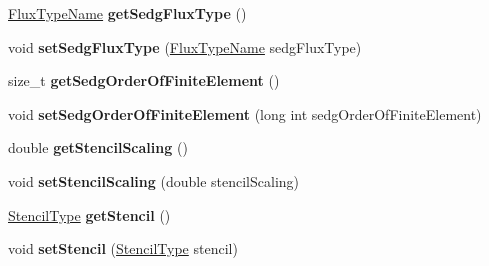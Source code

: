 \begin{DoxyCompactItemize}
\item 
\hypertarget{classnatrium_1_1SolverConfiguration_aecc2a87bc6e50d6e09ea035678478c4f}{
\hyperlink{namespacenatrium_a9366e68e932696b3dc277fc010ac1057}{FluxTypeName} {\bfseries getSedgFluxType} ()}
\label{classnatrium_1_1SolverConfiguration_aecc2a87bc6e50d6e09ea035678478c4f}

\item 
\hypertarget{classnatrium_1_1SolverConfiguration_a331256f91794e32be618b1162c321bdd}{
void {\bfseries setSedgFluxType} (\hyperlink{namespacenatrium_a9366e68e932696b3dc277fc010ac1057}{FluxTypeName} sedgFluxType)}
\label{classnatrium_1_1SolverConfiguration_a331256f91794e32be618b1162c321bdd}

\item 
\hypertarget{classnatrium_1_1SolverConfiguration_a1fad5bbbc062b1aad018da73e90033b2}{
size\_\-t {\bfseries getSedgOrderOfFiniteElement} ()}
\label{classnatrium_1_1SolverConfiguration_a1fad5bbbc062b1aad018da73e90033b2}

\item 
\hypertarget{classnatrium_1_1SolverConfiguration_a2a9ab8b6b6dcb47ad4bb85ef06e15dea}{
void {\bfseries setSedgOrderOfFiniteElement} (long int sedgOrderOfFiniteElement)}
\label{classnatrium_1_1SolverConfiguration_a2a9ab8b6b6dcb47ad4bb85ef06e15dea}

\item 
\hypertarget{classnatrium_1_1SolverConfiguration_adb7b45c43f97f0ce2ca288f92a32b577}{
double {\bfseries getStencilScaling} ()}
\label{classnatrium_1_1SolverConfiguration_adb7b45c43f97f0ce2ca288f92a32b577}

\item 
\hypertarget{classnatrium_1_1SolverConfiguration_a1dff19c0a3cc7386bd629dd72e59ac42}{
void {\bfseries setStencilScaling} (double stencilScaling)}
\label{classnatrium_1_1SolverConfiguration_a1dff19c0a3cc7386bd629dd72e59ac42}

\item 
\hypertarget{classnatrium_1_1SolverConfiguration_a962af94c9599c393d8a16d7f5ae04d6c}{
\hyperlink{namespacenatrium_a45d5dacaf5eb5efde670179d949173ba}{StencilType} {\bfseries getStencil} ()}
\label{classnatrium_1_1SolverConfiguration_a962af94c9599c393d8a16d7f5ae04d6c}

\item 
\hypertarget{classnatrium_1_1SolverConfiguration_afa50192447fb027d0250a29b1ea86d1a}{
void {\bfseries setStencil} (\hyperlink{namespacenatrium_a45d5dacaf5eb5efde670179d949173ba}{StencilType} stencil)}
\label{classnatrium_1_1SolverConfiguration_afa50192447fb027d0250a29b1ea86d1a}


\end{DoxyCompactItemize}
